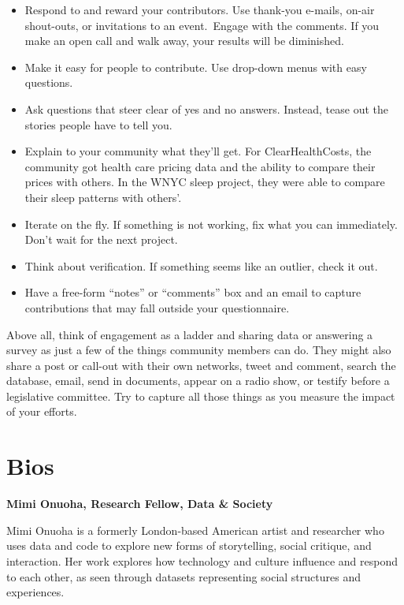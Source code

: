 \begin{itemize}
\begin{itemize}
\begin{itemize}
\item Respond to and reward your contributors. Use thank-you e-mails, on-air shout-outs, or invitations to an event. Engage with the comments. If you make an open call and walk away, your results will be diminished. 

\item Make it easy for people to contribute. Use drop-down menus with easy questions. 

\item Ask questions that steer clear of yes and no answers. Instead, tease out the stories people have to tell you. 

\item Explain to your community what they’ll get. For ClearHealthCosts, the community got health care pricing data and the ability to compare their prices with others. In the WNYC sleep project, they were able to compare their sleep patterns with others’. 

\item Iterate on the fly. If something is not working, fix what you can immediately. Don’t wait for the next project. 

\item Think about verification. If something seems like an outlier, check it out. 

\item Have a free-form ``notes'' or ``comments'' box and an email to capture contributions that may fall outside your questionnaire.
\end{itemize}
Above all, think of engagement as a ladder and sharing data or answering a survey as just a few of the things community members can do. They might also share a post or call-out with their own networks, tweet and comment, search the database, email, send in documents, appear on a radio show, or testify before a legislative committee. Try to capture all those things as you measure the impact of your efforts.


\chapter{Bios}

\textbf{Mimi Onuoha, Research Fellow, Data & Society} 

Mimi Onuoha is a formerly London-based American artist and researcher who uses data and code to explore new forms of storytelling, social critique, and interaction. Her work explores how technology and culture influence and respond to each other, as seen through datasets representing social structures and experiences.


\end{itemize}
\end{itemize}
